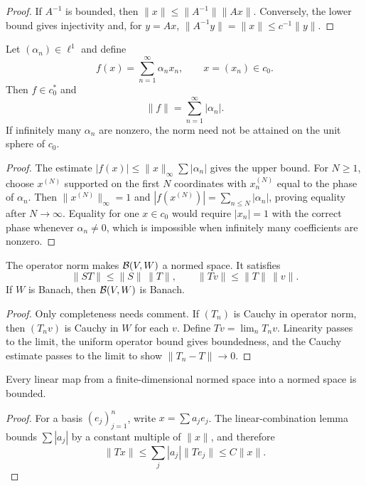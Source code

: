 \begin{proof}
If $A^{-1}$ is bounded, then
$\|x\|\le\|A^{-1}\|\|Ax\|$.  Conversely, the lower bound gives
injectivity and, for $y=Ax$,
$\|A^{-1}y\|=\|x\|\le c^{-1}\|y\|$.
\end{proof}

\begin{noteexercise}[A functional on $c_0$]
Let $(\alpha_n)\in\ell^1$ and define
\[
  f(x)=\sum_{n=1}^{\infty}\alpha_nx_n,
  \qquad x=(x_n)\in c_0.
\]
Then $f\in c_0^*$ and
\[
  \|f\|=\sum_{n=1}^{\infty}|\alpha_n|.
\]
If infinitely many $\alpha_n$ are nonzero, the norm need not be attained on
the unit sphere of $c_0$.
\end{noteexercise}

\begin{proof}
The estimate $|f(x)|\le\|x\|_\infty\sum|\alpha_n|$ gives the upper bound.
For $N\ge1$, choose $x^{(N)}$ supported on the first $N$ coordinates with
$x_n^{(N)}$ equal to the phase of $\alpha_n$.  Then
$\|x^{(N)}\|_\infty=1$ and
$|f(x^{(N)})|=\sum_{n\le N}|\alpha_n|$, proving equality after
$N\to\infty$.  Equality for one $x\in c_0$ would require
$|x_n|=1$ with the correct phase whenever $\alpha_n\ne0$, which is impossible
when infinitely many coefficients are nonzero.
\end{proof}

\begin{notetheorem}
The operator norm makes $\mathcal{B}(V,W)$ a normed space.  It satisfies
\[
  \|ST\|\le\|S\|\,\|T\|,
  \qquad
  \|Tv\|\le\|T\|\,\|v\|.
\]
If $W$ is Banach, then $\mathcal{B}(V,W)$ is Banach.
\end{notetheorem}

\begin{proof}
Only completeness needs comment.  If $(T_n)$ is Cauchy in operator norm, then
$(T_nv)$ is Cauchy in $W$ for each $v$.  Define $Tv=\lim_nT_nv$.
Linearity passes to the limit, the uniform operator bound gives boundedness,
and the Cauchy estimate passes to the limit to show $\|T_n-T\|\to0$.
\end{proof}

\begin{notetheorem}
Every linear map from a finite-dimensional normed space into a normed space is
bounded.
\end{notetheorem}

\begin{proof}
For a basis $(e_j)_{j=1}^n$, write $x=\sum a_je_j$.  The
linear-combination lemma bounds $\sum|a_j|$ by a constant multiple of
$\|x\|$, and therefore
\[
  \|Tx\|\le\sum_j|a_j|\|Te_j\|\le C\|x\|.
\]
\end{proof}

